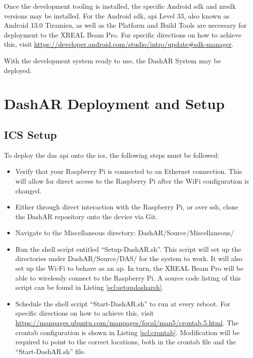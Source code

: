             \par Once the development tooling is installed, the specific Android \gls{sdk} and \gls{nrsdk} versions may be installed. For the Android \gls{sdk}, \gls{api} Level 33, also known as Android 13.0 Tiramisu, as well as the Platform and Build Tools are necessary for deployment to the XREAL Beam Pro. For specific directions on how to achieve this, visit \url{https://developer.android.com/studio/intro/update#sdk-manager}.

            \par With the development system ready to use, the DashAR System may be deployed.

    \section{DashAR Deployment and Setup}
        \subsection{ICS Setup}
            \label{subsec:icssetup}
            \par To deploy the \gls{das} \gls{api} onto the \gls{ics}, the following steps must be followed:

            \begin{itemize}
                \item Verify that your Raspberry Pi is connected to an Ethernet connection. This will allow for direct access to the Raspberry Pi after the WiFi configuration is changed.
                \item Either through direct interaction with the Raspberry Pi, or over \gls{ssh}, clone the DashAR repository onto the device via Git.
                \item Navigate to the Miscellaneous directory: DashAR/Source/Miscellaneous/
                \item Run the shell script entitled ``Setup-DashAR.sh''. This script will set up the directories under DashAR/Source/DAS/ for the system to work. It will also set up the Wi-Fi to behave as an \gls{ap}. In turn, the XREAL Beam Pro will be able to wirelessly connect to the Raspberry Pi. A source code listing of this script can be found in Listing \ref{scl:setupdasharsh}.
                \item Schedule the shell script ``Start-DashAR.sh'' to run at every reboot. For specific directions on how to achieve this, visit \url{https://manpages.ubuntu.com/manpages/focal/man5/crontab.5.html}. The crontab configuration is shown in Listing \ref{scl:crontab}. Modification will be required to point to the correct locations, both in the crontab file and the ``Start-DashAR.sh'' file.
            \end{itemize}

